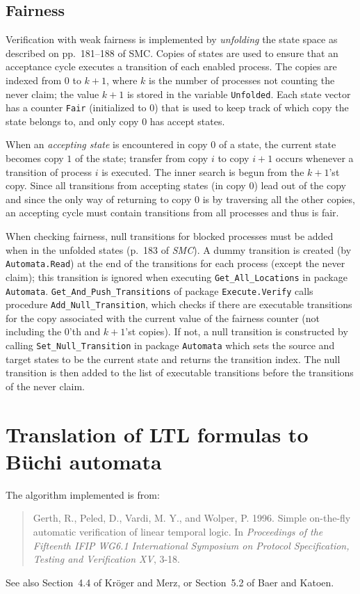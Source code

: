 \documentclass[11pt]{article}
\newcommand*{\smc}{\textit{SMC}}
\newcommand*{\p}[1]{\texttt{#1}}
\begin{document}
\subsection{Fairness}\label{s.fair}
Verification with weak fairness is implemented by \emph{unfolding} the
state space as described on pp.~181--188 of SMC. Copies of states are
used to ensure that an acceptance cycle executes a transition of each
enabled process. The copies are indexed from $0$ to $k+1$, where $k$ is
the number of processes not counting the never claim; the value $k+1$ is
stored in the variable \p{Unfolded}. Each state vector has a counter
\p{Fair} (initialized to $0$) that is used to keep track of which copy
the state belongs to, and only copy $0$ has accept states.

When an \emph{accepting state} is encountered in copy $0$ of a state,
the current state becomes copy $1$ of the state; transfer from copy $i$
to copy $i+1$ occurs whenever a transition of process $i$ is executed.
The inner search is begun from the $k+1$'st copy. Since all transitions
from accepting states (in copy $0$) lead out of the copy and since the only
way of returning to copy $0$ is by traversing all the other copies, an
accepting cycle must contain transitions from all processes and thus is
fair.

When checking fairness, null transitions for blocked processes must be
added when in the unfolded states (p.~183 of \smc{}). A dummy transition
is created (by \p{Automata.Read}) at the end of the transitions for each
process (except the never claim); this transition is ignored when
executing \p{Get\_All\_Locations} in package \p{Automata}.
\p{Get\_And\_Push\_Transitions} of package \p{Execute.Verify} calls
procedure \p{Add\_Null\_Transition}, which checks if there are
executable transitions for the copy associated with the current value of
the fairness counter (not including the $0$'th and $k+1$'st copies). If
not, a null transition is constructed by calling
\p{Set\_Null\_Transition} in package \p{Automata} which sets the source
and target states to be the current state and returns the transition
index. The null transition is then added to the list of executable
transitions before the transitions of the never claim.

\section{Translation of LTL formulas to B\"{u}chi automata}\label{s.ltl}
The algorithm implemented is from:
\begin{quote}
Gerth, R., Peled, D., Vardi, M. Y., and Wolper, P. 1996. Simple
on-the-fly automatic verification of linear temporal logic. In
\emph{Proceedings of the Fifteenth IFIP WG6.1 International Symposium on
Protocol Specification, Testing and Verification XV}, 3-18.
\end{quote}
See also Section~4.4 of Kr\"{o}ger and Merz, or Section~5.2 of Baer and
Katoen.
\end{document}
